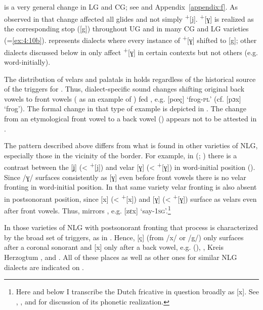  is a very general change in LG and CG; see \citet{Hall2014a} and Appendix~\ref{appendix:f}. As observed in \citet{Hall2014a} that change affected all glides and not simply  \textsuperscript{+}[j].  \textsuperscript{+}[ɣ] is realized as the corresponding stop ([g]) throughout UG and in many CG and LG varieties (=\ref{ex:4:10b}).  represents dialects where every instance of  \textsuperscript{+}[ɣ] shifted to [g]; other dialects discussed below in  only affect  \textsuperscript{+}[ɣ] in certain contexts but not others (e.g. word-initially).

The distribution of velars and palatals in  holds regardless of the historical source of the triggers for . Thus, dialect-specific sound changes shifting original back vowels to front vowels ( as an example of ) fed , e.g. [pœç] ‘frog-\textsc{pl}’ (cf. [pɔx] ‘frog’). The formal change in that type of example is depicted in . The change from an etymological front vowel to a back vowel () appears not to be attested in .

The pattern described above differs from what is found in other varieties of NLG, especially those in the vicinity of the  border. For example, in  (\citealt{Schönhoff1908}; ) there is a contrast between the  [ʝ] (< \textsuperscript{+}[j]) and velar [ɣ] (< \textsuperscript{+}[ɣ]) in word-initial position (). Since /ɣ/ surfaces consistently as [ɣ] even before front vowels there is no velar fronting in word-initial position. In that same variety velar fronting is also absent in postsonorant position, since [x] (< \textsuperscript{+}[x]) and [ɣ] (< \textsuperscript{+}[ɣ]) surface as velars even after front vowels. Thus,  mirrors , e.g. [zɛx] ‘say-\textsc{1sg}’.\footnote{Here and below I transcribe the Dutch fricative in question broadly as [x]. See \citet{Gussenhoven1992}, \citet{CollinsMees2003}, and \citet{Verhoeven2005} for discussion of its phonetic realization.}

In those varieties of NLG with postsonorant fronting that process is characterized by the broad set of triggers, as in . Hence, [ç] (from /x/ or /g/) only surfaces after a coronal sonorant and [x] only after a back vowel, e.g.  (\citealt{vorMohr1904}),  \citep{Kloeke1914}, Kreis Herzogtum  \citep{Heigener1937},  \citep{Bollmann1942} and  \citep{Pühn1956}. All of these places as well as other ones for similar NLG dialects are indicated on .

